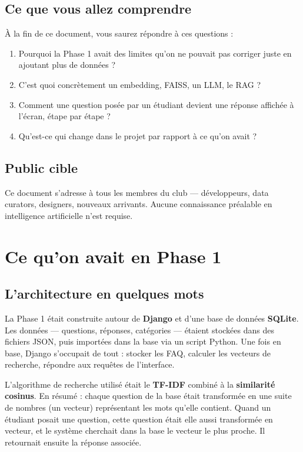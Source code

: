 \documentclass[11pt,a4paper]{article}
\begin{document}
\subsection{Ce que vous allez comprendre}

À la fin de ce document, vous saurez répondre à ces questions :

\begin{enumerate}
    \item Pourquoi la Phase 1 avait des limites qu'on ne pouvait pas
    corriger juste en ajoutant plus de données ?
    \item C'est quoi concrètement un embedding, FAISS, un LLM, le RAG ?
    \item Comment une question posée par un étudiant devient une réponse
    affichée à l'écran, étape par étape ?
    \item Qu'est-ce qui change dans le projet par rapport à ce qu'on avait ?
\end{enumerate}

\subsection{Public cible}

Ce document s'adresse à tous les membres du club --- développeurs,
data curators, designers, nouveaux arrivants. Aucune connaissance
préalable en intelligence artificielle n'est requise.

\clearpage

\section{Ce qu'on avait en Phase 1}

\subsection{L'architecture en quelques mots}

La Phase 1 était construite autour de \textbf{Django} et d'une base
de données \textbf{SQLite}. Les données --- questions, réponses,
catégories --- étaient stockées dans des fichiers JSON, puis importées
dans la base via un script Python. Une fois en base, Django s'occupait
de tout : stocker les FAQ, calculer les vecteurs de recherche,
répondre aux requêtes de l'interface.

L'algorithme de recherche utilisé était le \textbf{TF-IDF} combiné
à la \textbf{similarité cosinus}. En résumé : chaque question de la
base était transformée en une suite de nombres (un vecteur) représentant
les mots qu'elle contient. Quand un étudiant posait une question,
cette question était elle aussi transformée en vecteur, et le système
cherchait dans la base le vecteur le plus proche. Il retournait ensuite
la réponse associée.
\end{document}
